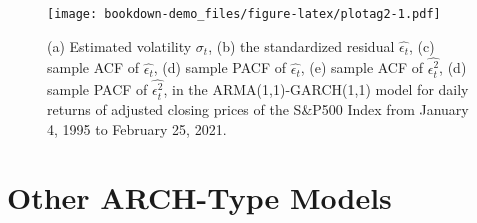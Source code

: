 \documentclass[]{book}
\newenvironment{Shaded}{\begin{snugshade}}{\end{snugshade}}
\newcommand{\DataTypeTok}[1]{\textcolor[rgb]{0.13,0.29,0.53}{#1}}
\newcommand{\DecValTok}[1]{\textcolor[rgb]{0.00,0.00,0.81}{#1}}
\newcommand{\KeywordTok}[1]{\textcolor[rgb]{0.13,0.29,0.53}{\textbf{#1}}}
\newcommand{\NormalTok}[1]{#1}
\newcommand{\OperatorTok}[1]{\textcolor[rgb]{0.81,0.36,0.00}{\textbf{#1}}}
\newcommand{\OtherTok}[1]{\textcolor[rgb]{0.56,0.35,0.01}{#1}}
\newcommand{\StringTok}[1]{\textcolor[rgb]{0.31,0.60,0.02}{#1}}
\begin{document}
\begin{Shaded}
\end{Shaded}

\begin{figure}
\centering
\texttt{[image: bookdown-demo\_files/figure-latex/plotag2-1.pdf]}
\caption{\label{fig:plotag2}(a) Estimated volatility \(\hat{\sigma_t}\), (b) the standardized residual \(\hat{\epsilon_t}\), (c) sample ACF of \(\hat{\epsilon_t}\), (d) sample PACF of \(\hat{\epsilon_t}\), (e) sample ACF of \(\hat{\epsilon_t^2}\), (d) sample PACF of \(\hat{\epsilon_t^2}\), in the ARMA(1,1)-GARCH(1,1) model for daily returns of adjusted closing prices of the S\&P500 Index from January 4, 1995 to February 25, 2021.}
\end{figure}

\newpage

\hypertarget{other-arch-type-models}{%
\section{Other ARCH-Type Models}\label{other-arch-type-models}}
\end{document}
